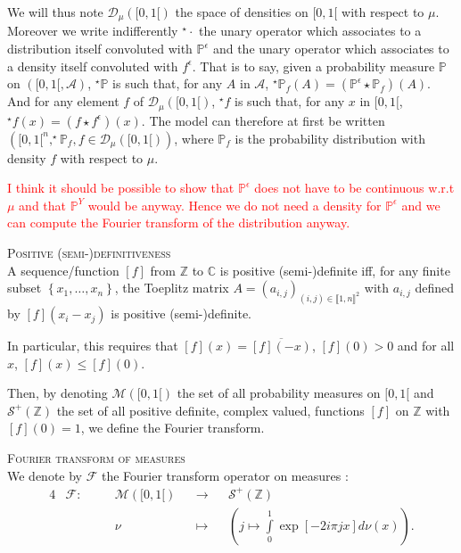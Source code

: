 We will thus note $\mathcal{D}_{\mu}([0,1[)$ the space of densities on $[0, 1[$ with respect to $\mu$.
Moreover we write indifferently $^{\star}\cdot$ the unary operator which associates to a distribution itself convoluted with $\mathds{P}^{\epsilon}$ and the unary operator which associates to a density itself convoluted with $f^{\epsilon}$.
That is to say, given a probability measure $\mathds{P}$ on $\left([0, 1[, \mathcal{A}\right)$, $^{\star}\mathds{P}$ is such that, for any $A$ in $\mathcal{A}$, $^{\star}\mathds{P}_{f}(A) = (\mathds{P}^{\epsilon}\star\mathds{P}_{f})(A)$.
And for any element $f$ of $\mathcal{D}_{\mu}([0, 1[)$, $^{\star}f$ is such that, for any $x$ in $[0, 1[$, $^{\star}f(x) = (f \star f^{\epsilon})(x)$.
The model can therefore at first be written $\left([0,1[^{n}, ^{\star}\mathds{P}_{f}, f\in\mathcal{D}_{\mu}([0,1[) \right)$, where $\mathds{P}_{f}$ is the probability distribution with density $f$ with respect to $\mu$.

\textcolor{red}{I think it should be possible to show that $\mathds{P}^{\epsilon}$ does not have to be continuous w.r.t $\mu$ and that $\mathds{P}^{Y}$ would be anyway. Hence we do not need a density for $\mathds{P}^{\epsilon}$ and we can compute the Fourier transform of the distribution anyway.}

\medskip

\begin{de}{\textsc{Positive (semi-)definitiveness}\\}\label{DE_INTRO_CIRCULARDECONVOLUTION_SEMIDEF}
A sequence/function $[f]$ from $\mathds{Z}$ to $\mathds{C}$ is positive (semi-)definite iff, for any finite subset $\left\{x_{1}, \hdots, x_{n}\right\}$, the Toeplitz matrix $A=(a_{i,j})_{(i,j) \in \llbracket 1, n \rrbracket^{2}}$ with $a_{i,j}$ defined by $[f](x_{i} - x_{j})$ is positive (semi-)definite.

In particular, this requires that $[f](x) = \overline{[f](-x)}$, $[f](0) > 0$ and for all $x$, $[f](x) \leq [f](0).$
\end{de}

\medskip

Then, by denoting $\mathcal{M}([0, 1[)$ the set of all probability measures on $[0,1[$ and $\mathcal{S}^{+}(\mathds{Z})$ the set of all positive definite, complex valued, functions $[f]$ on $\mathds{Z}$ with $[f](0)=1$, we define the Fourier transform.

\begin{de}{\textsc{Fourier transform of measures}\\}\label{DE_INTRO_CIRCULARDECONVOLUTION_FOURIERMEASURE}
We denote by $\mathcal{F}$ the Fourier transform operator on measures :
\begin{alignat*}{4}
&\mathcal{F} : \quad && \mathcal{M}([0, 1[) &&\rightarrow&& \mathcal{S}^{+}(\mathds{Z})\\
& && \nu && \mapsto && \left(j \mapsto \int\limits_{0}^{1} \exp\left[- 2 i \pi j x\right] d\nu(x)\right).
\end{alignat*}
\end{de}

